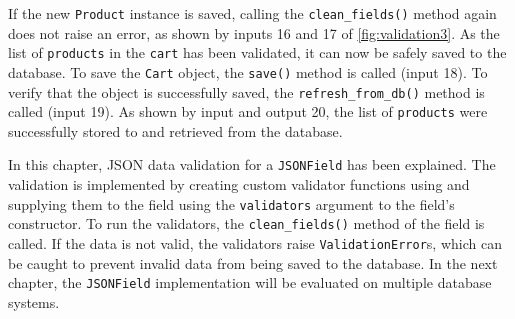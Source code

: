 If the new \verb|Product| instance is saved, calling the \verb|clean_fields()|
method again does not raise an error, as shown by inputs 16 and 17 of
\autoref{fig:validation3}. As the list of \verb|products| in the \verb|cart|
has been validated, it can now be safely saved to the database. To save the
\verb|Cart| object, the \verb|save()| method is called (input 18). To verify
that the object is successfully saved, the \verb|refresh_from_db()| method is
called (input 19). As shown by input and output 20, the list of \verb|products|
were successfully stored to and retrieved from the database.

In this chapter, JSON data validation for a \verb|JSONField| has been
explained. The validation is implemented by creating custom validator functions
using and supplying them to the field using the \verb|validators| argument to
the field's constructor. To run the validators, the \verb|clean_fields()|
method of the field is called. If the data is not valid, the validators raise
\verb|ValidationError|s, which can be caught to prevent invalid data from being
saved to the database. In the next chapter, the \verb|JSONField| implementation
will be evaluated on multiple database systems.
